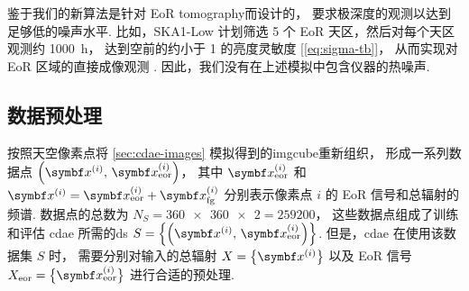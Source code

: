 鉴于我们的新算法是针对 EoR \ac{tomography}而设计的，
要求极深度的观测以达到足够低的噪声水平.
比如，SKA1-Low 计划筛选 5 个 EoR 天区，然后对每个天区观测约 \SI{1000}{\hour}，
达到空前的约小于 \SI{1}{\mK} 的亮度灵敏度 [\autoref{eq:sigma-tb}]，
从而实现对 EoR 区域的直接成像观测 \cite{mellema2013,mellema2015,koopmans2015}.
因此，我们没有在上述模拟中包含仪器的热噪声.

\subsection{数据预处理}
\label{sec:preprocessing}

按照天空像素点将 \autoref{sec:cdae-images} 模拟得到的\ac{imgcube}重新组织，
形成一系列数据点 $\left( \B{x}^{(i)}, \,\B{x}^{(i)}_{\R{eor}} \right)$，
其中 $\B{x}^{(i)}_{\R{eor}}$ 和
$\B{x}^{(i)} = \B{x}^{(i)}_{\R{eor}} + \B{x}^{(i)}_{\R{fg}}$
分别表示像素点 $i$ 的 EoR 信号和总辐射的频谱.
数据点的总数为 $N_S = \num{360x360 x 2} = \num{259200}$，
这些数据点组成了训练和评估 \ac{cdae} 所需的\ac{ds}
$S = \left\{ \left(\B{x}^{(i)}, \,\B{x}^{(i)}_{\R{eor}} \right) \right\}$.
但是，\ac{cdae} 在使用该数据集 $S$ 时，
需要分别对输入的总辐射 $X = \big\{ \B{x}^{(i)} \big\}$
以及 EoR 信号 $X_{\R{eor}} = \big\{ \B{x}^{(i)}_{\R{eor}} \big\}$
进行合适的预处理.


